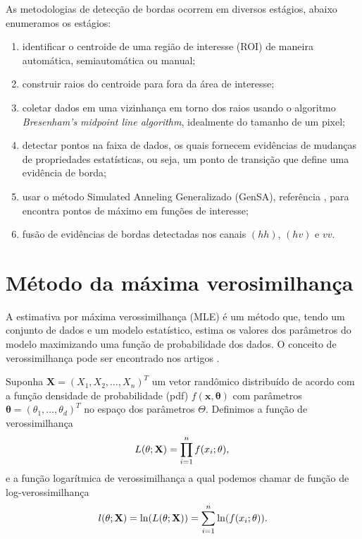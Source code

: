 \documentclass[conference]{IEEEtran}
\begin{document}
As metodologias de detecção de bordas ocorrem em diversos estágios, abaixo enumeramos os estágios:
\begin{enumerate}
	\item identificar o centroide de uma região de interesse (ROI) de maneira automática, semiautomática ou manual;
	\item construir raios do centroide para fora da área de interesse;
	\item coletar dados em uma vizinhança em torno dos raios usando o algoritmo {\it Bresenham's midpoint line algorithm}, idealmente do tamanho de um pixel;
	\item detectar pontos na faixa de dados, os quais fornecem evidências de mudanças de propriedades estatísticas, ou seja, um ponto de transição que define uma evidência de borda;
	\item usar o método Simulated Anneling Generalizado (GenSA), referência \cite{xgsh}, para encontra pontos de máximo em funções de interesse;
	\item fusão de evidências de bordas detectadas nos canais $(hh)$, $(hv)$ e $vv$.
\end{enumerate}

\section{Método da máxima verosimilhança}\label{sec_05}

 A estimativa por máxima verossimilhança (MLE) é um método que, tendo um conjunto de dados e um modelo estatístico, estima os valores dos parâmetros do modelo maximizando uma função de probabilidade dos dados. O conceito de verossimilhança pode ser encontrado nos artigos \cite{nhfc, gmbf}.

Suponha $\mathbf{X}=(X_1,X_2,\dots,X_n)^T$ um vetor randômico distribuído de acordo com a função densidade de probabilidade (pdf) $f(\mathbf{x},\mathbf{\theta})$ com parâmetros $\mathbf{\theta}=(\theta_1,\dots,\theta_d)^T$ no espaço dos parâmetros $\Theta$. Definimos  a função de verossimilhança
\begin{equation*}
    L(\theta;\mathbf{X}) = \prod_{i=1}^{n}f(x_i;\theta), \\
\end{equation*}
e a função logarítmica de verossimilhança a qual podemos chamar de função de log-verossimilhança
\begin{equation}\label{eq_09}
	l(\theta;\mathbf{X})= \ln(L(\theta;\mathbf{X})) = \sum_{i=1}^{n}\ln(f(x_i;\theta)). \\
\end{equation}
\end{document}
